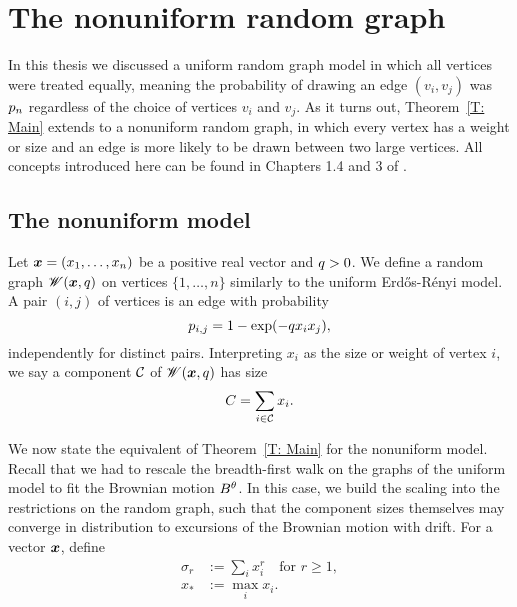 
\chapter{The nonuniform random graph} \label{C: nonuniform graph}

In this thesis we discussed a uniform random graph model in which all vertices were treated equally,
meaning the probability of drawing an edge $(v_i,v_j)$ was $p_n$ regardless of the choice of vertices $v_i$ and $v_j$.
As it turns out, Theorem~\ref{T: Main} extends to a nonuniform random graph,
in which every vertex has a weight or size and an edge is more likely to be drawn between two large vertices.
All concepts introduced here can be found in Chapters 1.4 and 3 of \cite{Aldous.1997}.

\section{The nonuniform model}
Let $\boldsymbol{x} = (x_1, \dots, x_n)$ be a positive real vector and $q > 0$.
We define a random graph $\mathscr{W}(\boldsymbol{x}, q)$ on vertices $\{1, \dots, n\}$ similarly to the uniform Erd\H{o}s-Rényi model.
A pair $(i, j)$ of vertices is an edge with probability
\begin{equation}
	p_{i,j} = 1 - \exp(-q x_i x_j),
\end{equation}
independently for distinct pairs.
Interpreting $x_i$ as the size or weight of vertex $i$, we say a component $\mathcal{C}$ of $\mathscr{W}(\boldsymbol{x}, q)$ has size
\begin{equation}
	C = \sum_{i \in \mathcal{C}} x_i.
\end{equation}

We now state the equivalent of Theorem~\ref{T: Main} for the nonuniform model.
Recall that we had to rescale the breadth-first walk on the graphs of the uniform model to fit the Brownian motion $B^{\theta}$.
In this case, we build the scaling into the restrictions on the random graph, 
such that the component sizes themselves may converge in distribution to excursions of the Brownian motion with drift.
For a vector $\boldsymbol{x}$, define
\begin{equation}
\begin{aligned}
	\sigma_r &:= \sum_{i} x_i^r \quad \text{for $r \geq 1$}, \\
	x_* &:= \max_i x_i.
\end{aligned}
\end{equation}


